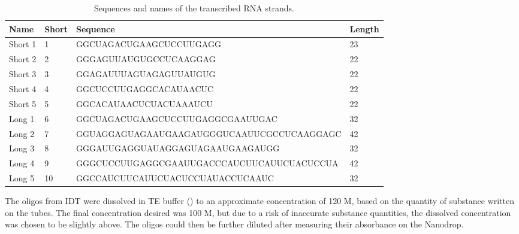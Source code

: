 \begin{table}
\begin{adjustbox}{width=\columnwidth}
\begin{tabular}{llll}
\hline
\textbf{Name}      & \textbf{Short} & \textbf{Sequence}                                           & \textbf{Length} \\
\hline
Short 1            & 1          & GGCUAGACUGAAGCUCCUUGAGG                    & 23     \\
Short 2            & 2          & GGGAGUUAUGUGCCUCAAGGAG                     & 22     \\
Short 3            & 3          & GGAGAUUUAGUAGAGUUAUGUG                     & 22     \\
Short 4            & 4          & GGCUCCUUGAGGCACAUAACUC                     & 22     \\
Short 5            & 5          & GGCACAUAACUCUACUAAAUCU                     & 22     \\
Long 1             & 6          & GGCUAGACUGAAGCUCCUUGAGGCGAAUUGAC           & 32     \\
Long 2             & 7          & GGUAGGAGUAGAAUGAAGAUGGGUCAAUUCGCCUCAAGGAGC & 42     \\
Long 3             & 8          & GGGAUUGAGGUAUAGGAGUAGAAUGAAGAUGG           & 32     \\
Long 4             & 9          & GGGCUCCUUGAGGCGAAUUGACCCAUCUUCAUUCUACUCCUA & 42     \\
Long 5             & 10         & GGCCAUCUUCAUUCUACUCCUAUACCUCAAUC           & 32     \\
\hline
\end{tabular}
\end{adjustbox}
\caption{Sequences and names of the transcribed RNA strands.}
\label{rna_strands}
\end{table}

The oligos from IDT were dissolved in TE buffer () to an approximate concentration of 120 \si{\micro}M, based on the quantity of substance written on the tubes. The final concentration desired was 100 \si{\micro}M, but due to a risk of inaccurate substance quantities, the dissolved concentration was chosen to be slightly above. The oligos could then be further diluted after measuring their absorbance on the Nanodrop.


